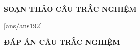 \documentclass[12pt,a4paper]{article}
\begin{document}
	\begin{center}
		\textbf{SOẠN THẢO CÂU TRẮC NGHIỆM }
	\end{center}
	[ans/ans192]
	
	\begin{center}
		\textbf{ĐÁP ÁN CÂU TRẮC NGHIỆM}
	\end{center}
	\begin{multicols}{10}
		
	\end{multicols}
\end{document}
